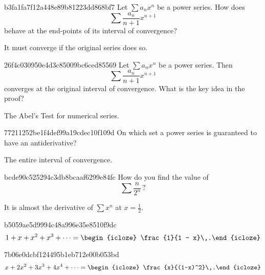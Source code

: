 \begin{note}{b3fa1fa7f12a448e89b81223dd868bf7}
    Let \({ \sum a_n x^{n} }\) be a power series.
    How does
    \[
        \sum \frac{a_n}{n+1}x^{n+1}
    \]
    behave at the end-points of its interval of convergence?

    \begin{cloze}{1}
        It must converge if the original series does so.
    \end{cloze}
\end{note}

\begin{note}{26f4c030950e4d3c85009bc6ced85569}
    Let \({ \sum a_n x^{n} }\) be a power series.
    Then
    \[
        \sum \frac{a_n}{n+1}x^{n+1}
    \]
    converges at the original interval of convergence.
    What is the key idea in the proof?

    \begin{cloze}{1}
        The Abel's Test for numerical series.
    \end{cloze}
\end{note}

\begin{note}{77211252be1f4def99a19cdec10f109d}
    On which set a power series is guaranteed to have an antiderivative?

    \begin{cloze}{1}
        The entire interval of convergence.
    \end{cloze}
\end{note}

\begin{note}{bcde90c525294c3db8bcaaf6299e84fc}
    How do you find the value of
    \[
        \sum \frac{n}{2^{n}}\,?
    \]

    \begin{cloze}{1}
        It is almost the derivative of \({ \sum x^{n} }\) at \({ x = \frac{1}{2} }\).
    \end{cloze}
\end{note}

\begin{note}{b5059ae5d9994c48a996e35e8510f9dc}
    \[
        1 + x + x^2 + x^3 + \cdots = \begin{icloze}{1}\frac{1}{1 - x}\,.\end{icloze}
    \]
\end{note}

\begin{note}{7b06e0dcbf124495b1eb712e00b053bd}
    \[
        x + 2x^2 + 3x^3 + 4x^4 + \cdots = \begin{icloze}{1}\frac{x}{(1-x)^2}\,.\end{icloze}
    \]
\end{note}

